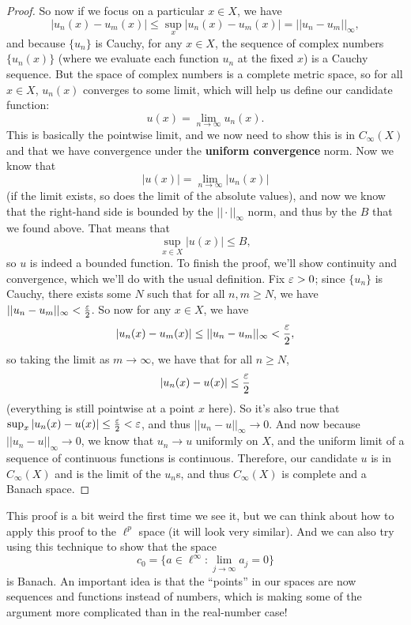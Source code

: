\begin{proof}
So now if we focus on a particular $x \in X$, we have
\[
    |u_n(x) - u_m(x)| \le \sup_{x} |u_n(x) - u_m(x)| = ||u_n - u_m||_{\infty},
\]
and because $\{u_n\}$ is Cauchy, for any $x \in X$, the sequence of complex numbers $\{u_n(x)\}$ (where we evaluate each function $u_n$ at the fixed $x$) is a Cauchy sequence. But the space of complex numbers is a complete metric space, so for all $x \in X$, $u_n(x)$ converges to some limit, which will help us define our candidate function:
\[
    u(x) = \lim_{n \to \infty} u_n(x).
\]
This is basically the pointwise limit, and we now need to show this is in $C_{\infty}(X)$ and that we have convergence under the \textbf{uniform convergence} norm. Now we know that 
\[
    |u(x)| = \lim_{n \to \infty} |u_n(x)|
\]
(if the limit exists, so does the limit of the absolute values), and now we know that the right-hand side is bounded by the $||\cdot||_{\infty}$ norm, and thus by the $B$ that we found above. That means that
\[
    \sup_{x \in X} |u(x)| \le B,
\]
so $u$ is indeed a bounded function. To finish the proof, we'll show continuity and convergence, which we'll do with the usual definition. Fix $\varepsilon > 0$; since $\{u_n\}$ is Cauchy, there exists some $N$ such that for all $n, m \ge N$, we have $||u_n - u_m||_{\infty} < \frac{\varepsilon}{2}$. So now for any $x \in X$, we have
\[
    |u_n(x) - u_m(x)| \le ||u_n - u_m||_{\infty} < \frac{\varepsilon}{2},
\]
so taking the limit as $m \to \infty$, we have that for all $n \ge N$, 
\[
    |u_n(x) - u(x)| \le \frac{\varepsilon}{2}
\]
(everything is still pointwise at a point $x$ here). So it's also true that $\sup_x |u_n(x) - u(x)| \le \frac{\varepsilon}{2} < \varepsilon$, and thus $||u_n - u||_{\infty} \to 0$. And now because $||u_n - u||_{\infty} \to 0$, we know that $u_n \to u$ uniformly on $X$, and the uniform limit of a sequence of continuous functions is continuous. Therefore, our candidate $u$ is in $C_{\infty}(X)$ and is the limit of the $u_n$s, and thus $C_{\infty}(X)$ is complete and a Banach space.
\end{proof}

This proof is a bit weird the first time we see it, but we can think about how to apply this proof to the $\ell^p$ space (it will look very similar). And we can also try using this technique to show that the space
\[
    c_0 = \{a \in \ell^{\infty}: \lim_{j \to \infty} a_j = 0\}
\]
is Banach. An important idea is that the ``points'' in our spaces are now sequences and functions instead of numbers, which is making some of the argument more complicated than in the real-number case!